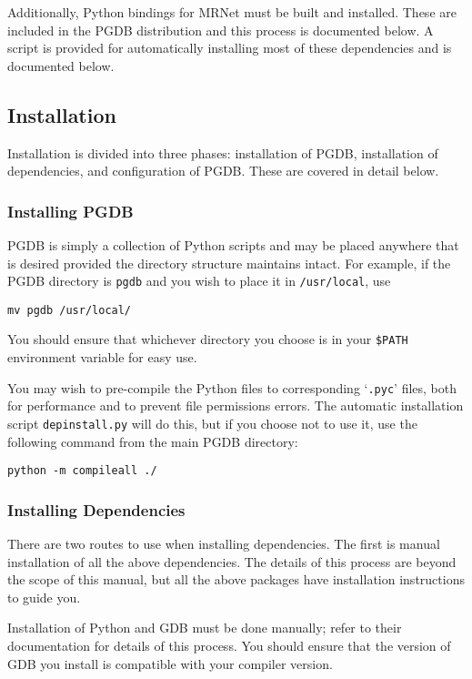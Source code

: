 \documentclass{refart}
\begin{document}
Additionally, Python bindings for MRNet must be built and installed. These are included in the PGDB distribution and this process is documented below. A script is provided for automatically installing most of these dependencies and is documented below.

\subsection{Installation}

Installation is divided into three phases: installation of PGDB, installation of dependencies, and configuration of PGDB. These are covered in detail below.

\subsubsection{Installing PGDB}

PGDB is simply a collection of Python scripts and may be placed anywhere that is desired provided the directory structure maintains intact. For example, if the PGDB directory is \texttt{pgdb} and you wish to place it in \texttt{/usr/local}, use

\begin{Verbatim}
mv pgdb /usr/local/
\end{Verbatim}

You should ensure that whichever directory you choose is in your \texttt{\$PATH} environment variable for easy use.

You may wish to pre-compile the Python files to corresponding `\texttt{.pyc}' files, both for performance and to prevent file permissions errors. The automatic installation script \texttt{depinstall.py} will do this, but if you choose not to use it, use the following command from the main PGDB directory:
\begin{Verbatim}
python -m compileall ./
\end{Verbatim}

\subsubsection{Installing Dependencies}

There are two routes to use when installing dependencies. The first is manual installation of all the above dependencies. The details of this process are beyond the scope of this manual, but all the above packages have installation instructions to guide you.

Installation of Python and GDB must be done manually; refer to their documentation for details of this process. You should ensure that the version of GDB you install is compatible with your compiler version.
\end{document}
